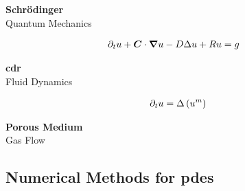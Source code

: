 \begin{frame}
\begin{multicols}{3}
\begin{center}
            \vspace*{0.125cm}
            {\large \textbf{Schrödinger}} \\
            Quantum Mechanics
        \end{center}

        \begin{center}
            \begin{align*}
                \partial_t u + \bm{C} \cdot \bm{\nabla} u - D \Delta u + R u &= g
            \end{align*}

            \vspace*{0.125cm}
            {\large \textbf{\acrshort{cdr}}} \\
            Fluid Dynamics
        \end{center}

        \begin{center}
            \begin{align*}
                \partial_t u = \Delta \left( u^m \right)
            \end{align*}
            
            \vspace*{0.125cm}
            {\large \textbf{Porous Medium}} \\
            Gas Flow
        \end{center}

    \end{multicols}
    \vspace*{\fill}
    
\end{frame}

\subsection{Numerical Methods for \texorpdfstring{\acrlong{pdes}}{}}

